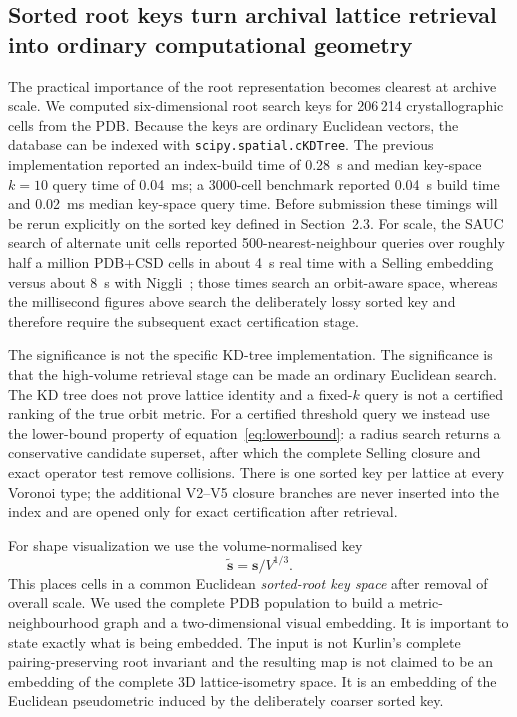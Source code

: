 \documentclass[11pt]{article}
\newcommand{\sortkey}{\mathbf{s}}
\begin{document}
\subsection{Sorted root keys turn archival lattice retrieval into ordinary computational geometry}

The practical importance of the root representation becomes clearest at archive scale. We computed six-dimensional root search keys for 206\,214 crystallographic cells from the PDB. Because the keys are ordinary Euclidean vectors, the database can be indexed with \texttt{scipy.spatial.cKDTree}. The previous implementation reported an index-build time of \SI{0.28}{\second} and median key-space $k=10$ query time of \SI{0.04}{\milli\second}; a 3000-cell benchmark reported \SI{0.04}{\second} build time and \SI{0.02}{\milli\second} median key-space query time. Before submission these timings will be rerun explicitly on the sorted key defined in Section~2.3. For scale, the SAUC search of alternate unit cells reported 500-nearest-neighbour queries over roughly half a million PDB+CSD cells in about \SI{4}{\second} real time with a Selling embedding versus about \SI{8}{\second} with Niggli~\cite{mcgill2014}; those times search an orbit-aware space, whereas the millisecond figures above search the deliberately lossy sorted key and therefore require the subsequent exact certification stage.

The significance is not the specific KD-tree implementation. The significance is that the high-volume retrieval stage can be made an ordinary Euclidean search. The KD tree does not prove lattice identity and a fixed-$k$ query is not a certified ranking of the true orbit metric. For a certified threshold query we instead use the lower-bound property of equation~\eqref{eq:lowerbound}: a radius search returns a conservative candidate superset, after which the complete Selling closure and exact operator test remove collisions. There is one sorted key per lattice at every Voronoi type; the additional V2--V5 closure branches are never inserted into the index and are opened only for exact certification after retrieval.

For shape visualization we use the volume-normalised key
\[
\tilde{\sortkey}=\sortkey/V^{1/3}.
\]
This places cells in a common Euclidean \emph{sorted-root key space} after removal of overall scale. We used the complete PDB population to build a metric-neighbourhood graph and a two-dimensional visual embedding. It is important to state exactly what is being embedded. The input is not Kurlin's complete pairing-preserving root invariant and the resulting map is not claimed to be an embedding of the complete 3D lattice-isometry space. It is an embedding of the Euclidean pseudometric induced by the deliberately coarser sorted key.
\end{document}
